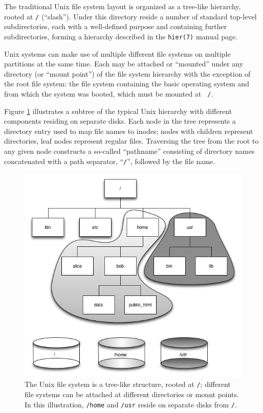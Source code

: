 The traditional Unix file system layout is organized
as a tree-like hierarchy, rooted at {\tt /}
(``slash'').  Under this directory reside a number of
standard top-level subdirectories, each with a
well-defined purpose and containing further
subdirectories, forming a hierarchy described in the
{\tt hier(7)} manual page.

Unix systems can make use of multiple different file
systems on multiple partitions at the same time.  Each
may be attached or ``mounted'' under any directory (or
``mount point'') of the file system hierarchy with the
exception of the root file system: the file system
containing the basic operating system and from which
the system was booted, which must be mounted at {\tt
/}.

Figure \ref{fig:file-systems:layout} illustrates a
subtree of the typical Unix hierarchy with different
components residing on separate disks.  Each node in
the tree represents a directory entry used to map
file names to inodes; nodes with children
represent directories, leaf nodes represent regular
files.  Traversing the tree from the root to any given
node constructs a so-called
``pathname'' consisting of directory
names concatenated with a path separator, ``{\tt /}'',
followed by the file name.

\begin{figure}[ht]
	\centering
	\includegraphics[width=.75\textwidth]{04/pics/filesystem-tree-mountpoints}
		\caption[File System Hierarchy]{The Unix file system is a
			tree-like structure, rooted at {\tt /}; 
			different file systems can be attached at
			different directories or mount points.  In
                        this illustration, {\tt /home} and {\tt /usr}
                        reside on separate disks from {\tt /}.
			\label{fig:file-systems:layout}}
\end{figure}


